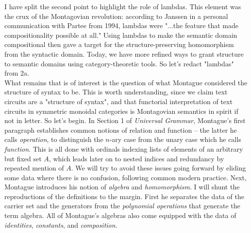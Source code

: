 I have split the second point to highlight the role of lambdas. This element was the crux of the Montagovian revolution: according to Janssen in a personal communication with Partee from 1994, lambdas were "...the feature that made compositionality possible at all." Using lambdas to make the semantic domain compositional then gave a target for the structure-preserving homomorphism from the syntactic domain. Today, we have more refined ways to grant structure to semantic domains using category-theoretic tools. So let's redact "lambdas" from 2a.\\

What remains that is of interest is the question of what Montague considered the structure of syntax to be. This is worth understanding, since we claim text circuits are a "structure of syntax", and that functorial interpretation of text circuits in symmetric monoidal categories is Montagovian semantics in spirit if not in letter. So let's begin. In Section 1 of \emph{Universal Grammar}, Montague's first paragraph establishes common notions of relation and function -- the latter he calls \emph{operation}, to distinguish the $n$-ary case from the unary case which he calls \emph{function}. This is all done with ordinals indexing lists of elements of an arbitrary but fixed set $A$, which leads later on to nested indices and redundancy by repeated mention of $A$. We will try to avoid these issues going forward by eliding some data where there is no confusion, following common modern practice. Next, Montague introduces his notion of \emph{algebra} and \emph{homomorphism}. I will shunt the reproductions of the definitions to the margin. First he separates the data of the carrier set and the generators from the \emph{polynomial operations} that generate the term algebra. All of Montague's algebras also come equipped with the data of \emph{identities}, \emph{constants}, and \emph{composition}.\\

